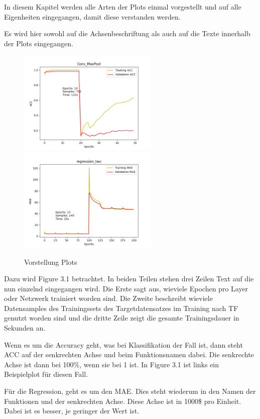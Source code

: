 In diesem Kapitel werden alle Arten der Plots einmal vorgestellt und auf alle Eigenheiten eingegangen, damit diese verstanden werden. 

Es wird hier sowohl auf die Achsenbeschriftung als auch auf die Texte innerhalb der Plots eingegangen. 

\begin{figure}[htpb]
    \includegraphics[height=5cm]{../../Plots/ba_plots/convmaxpool/2TFtr.png}
    \includegraphics[height=5cm]{../../Plots/ba_plots/regr2/regr2train.png}
    \caption{\label{fig:ploterkl} Vorstellung Plots}
\end{figure}

Dazu wird Figure 3.1 betrachtet. In beiden Teilen stehen drei Zeilen Text auf die nun einzelnd eingegangen wird. Die Erste sagt aus, 
wieviele Epochen pro Layer oder Netzwerk trainiert worden sind. Die Zweite beschreibt wieviele Datensamples des Trainingssets des 
Targetdatensatzes im Training nach TF genutzt worden sind und die dritte Zeile zeigt die gesamte Trainingsdauer in Sekunden an. 

Wenn es um die Accuracy geht, was bei Klassifikation der Fall ist, dann steht ACC auf der senkrechten Achse und beim Funktionsnamen dabei. 
Die senkrechte Achse ist dann bei 100\%, wenn sie bei 1 ist. In Figure 3.1 ist links ein Beispielplot für diesen Fall. 

Für die Regression, geht es um den MAE. Dies steht wiederum in den Namen der Funktionen und der senkrechten Achse. Diese Achse ist in 1000\$ pro 
Einheit. Dabei ist es besser, je geringer der Wert ist. 
